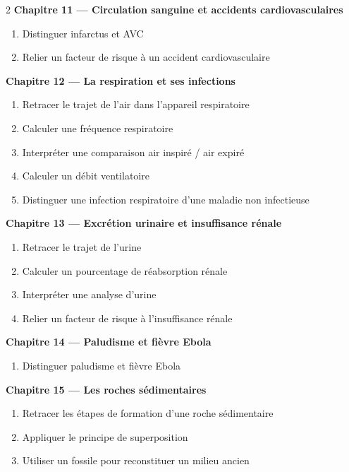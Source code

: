 \begin{multicols}{2}
\textbf{\normalsize\color{onbo}Chapitre 11 --- Circulation sanguine et accidents cardiovasculaires}
\begin{enumerate}[label=\arabic*.,itemsep=1pt,topsep=2pt,leftmargin=1.6em]
\item Distinguer infarctus et AVC
\item Relier un facteur de risque à un accident cardiovasculaire
\end{enumerate}
\vspace{4pt}

\textbf{\normalsize\color{onbo}Chapitre 12 --- La respiration et ses infections}
\begin{enumerate}[label=\arabic*.,itemsep=1pt,topsep=2pt,leftmargin=1.6em]
\item Retracer le trajet de l'air dans l'appareil respiratoire
\item Calculer une fréquence respiratoire
\item Interpréter une comparaison air inspiré / air expiré
\item Calculer un débit ventilatoire
\item Distinguer une infection respiratoire d'une maladie non infectieuse
\end{enumerate}
\vspace{4pt}

\textbf{\normalsize\color{onbo}Chapitre 13 --- Excrétion urinaire et insuffisance rénale}
\begin{enumerate}[label=\arabic*.,itemsep=1pt,topsep=2pt,leftmargin=1.6em]
\item Retracer le trajet de l'urine
\item Calculer un pourcentage de réabsorption rénale
\item Interpréter une analyse d'urine
\item Relier un facteur de risque à l'insuffisance rénale
\end{enumerate}
\vspace{4pt}

\textbf{\normalsize\color{onbo}Chapitre 14 --- Paludisme et fièvre Ebola}
\begin{enumerate}[label=\arabic*.,itemsep=1pt,topsep=2pt,leftmargin=1.6em]
\item Distinguer paludisme et fièvre Ebola
\end{enumerate}
\vspace{4pt}

\textbf{\normalsize\color{onbo}Chapitre 15 --- Les roches sédimentaires}
\begin{enumerate}[label=\arabic*.,itemsep=1pt,topsep=2pt,leftmargin=1.6em]
\item Retracer les étapes de formation d'une roche sédimentaire
\item Appliquer le principe de superposition
\item Utiliser un fossile pour reconstituer un milieu ancien
\end{enumerate}
\vspace{4pt}


\end{multicols}
